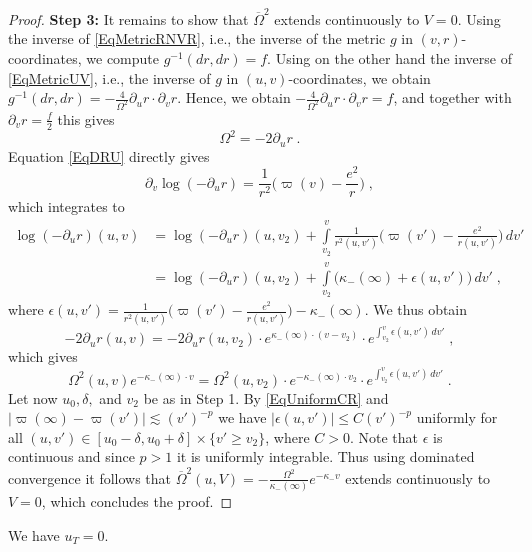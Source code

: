 \documentclass[reqno]{article}
\newcommand{\rd}{\partial}
\begin{document}
\begin{proof}
\textbf{Step 3:} It remains to show that $\overline{\Omega}^2$ extends continuously to $V=0$. Using the inverse of \eqref{EqMetricRNVR}, i.e., the inverse of the metric $g$ in $(v,r)$-coordinates, we compute $g^{-1}(dr, dr) = f$. Using on the other hand the inverse of \eqref{EqMetricUV}, i.e., the inverse of $g$ in $(u,v)$-coordinates, we obtain $g^{-1}(dr, dr) = -\frac{4}{\Omega^2} \rd_u r \cdot \rd_v r$. Hence, we obtain $- \frac{4}{\Omega^2} \rd_u r \cdot \rd_v r = f$, and together with $\rd_v r = \frac{f}{2}$ this gives $$\Omega^2 = - 2\rd_u r \;.$$
Equation \eqref{EqDRU} directly gives $$\rd_v \log (-\rd_u r) = \frac{1}{r^2} \big(\varpi(v) - \frac{e^2}{r} \big) \;,$$
which integrates to
\begin{equation*}
\begin{split}
\log(-\rd_u r) (u,v) &= \log(-\rd_u r) (u,v_2) + \int\limits_{v_2}^v \frac{1}{r^2(u,v')} \big( \varpi(v') - \frac{e^2}{r(u,v')} \big) \, dv' \\
&= \log(-\rd_u r) (u,v_2) + \int\limits_{v_2}^v  \big( \kappa_-(\infty) + \epsilon( u,v') \big) \, dv' \;,
\end{split}
\end{equation*}
where $\epsilon( u,v')  = \frac{1}{r^2(u,v')} \big( \varpi(v') - \frac{e^2}{r(u,v')} \big)  - \kappa_-(\infty)$. 
We thus obtain $$-2 \rd_u r(u,v) = - 2\rd_u r(u,v_2) \cdot e^{\kappa_-(\infty) \cdot (v - v_2)} \cdot e^{\int_{v_2}^v \epsilon(u,v') \, dv'} \;,$$ which gives 
$$\Omega^2(u,v) e^{-\kappa_-(\infty)\cdot  v} = \Omega^2(u,v_2) \cdot e^{-\kappa_-(\infty) \cdot v_2} \cdot e^{\int_{v_2}^v \epsilon(u,v') \, dv'} \;.$$
Let now $u_0, \delta,$ and $v_2$ be as in Step 1. By \eqref{EqUniformCR} and $|\varpi(\infty) - \varpi(v')| \lesssim (v')^{-p}$ we have $|\epsilon ( u,v') | \leq C (v')^{-p}$ uniformly for all $ (u,v') \in [u_0 - \delta, u_0 + \delta] \times \{v' \geq v_2\}$, where $C>0$.  Note that $\epsilon$ is continuous and since $p>1$ it is uniformly integrable. Thus using dominated convergence it follows that $\overline{\Omega}^2(u,V) = - \frac{\Omega^2}{\kappa_-(\infty)} e^{-\kappa_- v}$ extends continuously to $V=0$, which concludes the proof.
\end{proof}

\begin{proposition} \label{PropTrapped}
We have $u_T = 0$.
\end{proposition}
\end{document}
